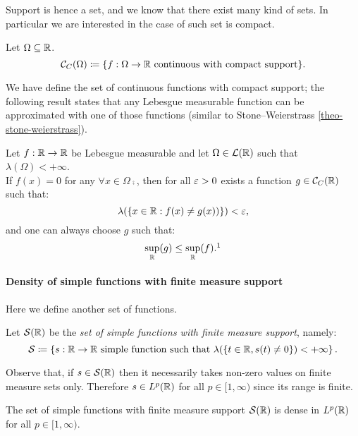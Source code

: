 Support is hence a set, and we know that there exist many kind of sets. In particular we are interested in the case of such set is compact.

\begin{defn}
	Let $\Omega \subseteq \mathbb R$.
	$$
		\mathcal C_C(\Omega) 
		\coloneqq \{ f: \Omega \to \mathbb R \text{ continuous with compact support} \}
	.
	$$
\end{defn}

We have define the set of continuous functions with compact support; the following result states that any Lebesgue measurable function can be approximated with one of those functions (similar to Stone--Weierstrass \vref{theo-stone-weierstrass}).

\begin{theo}[Lusin]\label{theo-lusin}
	Let $f:\mathbb R\to \mathbb R $ be Lebesgue measurable and let $\Omega \in \mathcal L(\mathbb R)$ such that $\lambda (\Omega) < +\infty$. \\
	If $f(x)=0$ for any $\forall x \in \Omega \comp$, then for all $\varepsilon > 0$ exists a function $g \in \mathcal C_C (\mathbb R)$ such that:
		$$
		\lambda(
			\{
				x \in \mathbb R : f(x) \neq g(x))
			\}
		) 
		<\varepsilon
		,
		$$
	and one can always choose $g$ such that:
		$$
		\sup_{\RR}(g) 
		\leq \sup_{\RR}(f)
		.
		\footnotemark{}
		$$
\end{theo}


\paragraph{Density of simple functions with finite measure support} Here we define another set of functions.

\begin{defn}
	Let $\mathcal S(\mathbb R)$ be the \emph{set of simple functions with finite measure support}, namely:
	$$
	\mathcal S 
	\coloneqq 
	\left\{
		s:\mathbb R\to\mathbb R\text{ simple function such that }
		\lambda(\{ t\in\mathbb R, s(t) \neq 0 \}) 
		< +\infty
	\right\}
	.
	$$
\end{defn}

Observe that, if $s \in \mathcal S(\mathbb R)$ then it necessarily takes non-zero values on finite measure sets only. Therefore $s \in L^p(\mathbb R)$ for all $p \in [1, \infty)$ since its range is finite.

\begin{theo}
	The set of simple functions with finite measure support	$\mathcal S(\mathbb R)$ is dense in $L^p(\mathbb R)$ for all $p \in [1,\infty)$.
\end{theo}

